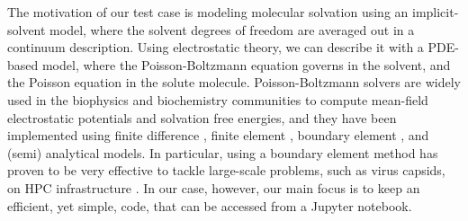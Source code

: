 The motivation of our test case is modeling molecular solvation using an implicit-solvent model, where the solvent degrees of freedom are averaged out in a continuum description.
Using electrostatic theory, we can describe it with a PDE-based model, where the Poisson-Boltzmann equation governs in the solvent, and the Poisson equation in the solute molecule.
Poisson-Boltzmann solvers are widely used in the biophysics and biochemistry communities to compute mean-field electrostatic potentials and solvation free energies, and they have been implemented using finite difference \cite{delphi, apbs}, finite element \cite{apbs}, boundary element \cite{afmpb, tabi, pygbe}, and (semi) analytical \cite{thg} models. 
In particular, using a boundary element method has proven to be very effective to tackle large-scale problems, such as virus capsids, on HPC infrastructure \cite{lu}.
In our case, however, our main focus is to keep an efficient, yet simple, code, that can be accessed from a Jupyter notebook.
